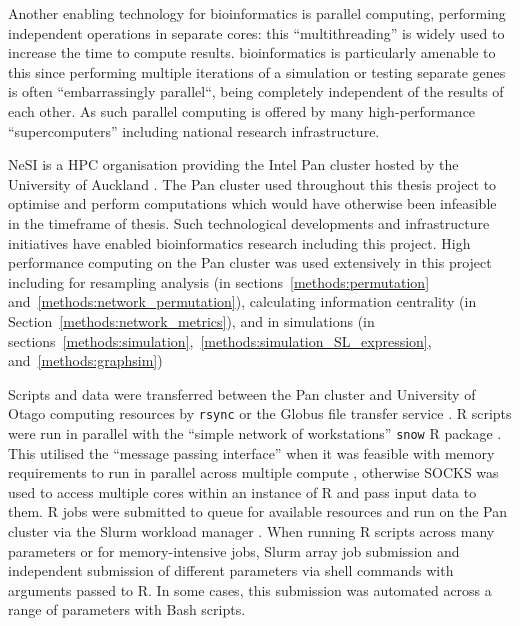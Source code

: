 Another enabling technology for \gls{bioinformatics} is parallel computing, performing independent operations in separate cores: this ``multithreading'' is widely used to increase the time to compute results. \Gls{bioinformatics} is particularly amenable to this since performing multiple iterations of a simulation or testing separate genes is often ``embarrassingly parallel``, being completely independent of the results of each other. As such parallel computing is offered by many high-performance ``supercomputers'' including national research infrastructure.

\Gls{NeSI} is a \gls{HPC} organisation providing the Intel Pan cluster hosted by the University of Auckland \citep{NeSI}. The Pan cluster used throughout this thesis project to optimise and perform computations which would have otherwise been infeasible in the timeframe of thesis. Such technological developments and infrastructure initiatives have enabled \gls{bioinformatics} research including this project.  High performance computing on the Pan cluster was used extensively in this project including for resampling analysis (in sections~\ref{methods:permutation} and~\ref{methods:network_permutation}), calculating \gls{information centrality} (in Section~\ref{methods:network_metrics}), and in simulations (in sections~\ref{methods:simulation},~\ref{methods:simulation_SL_expression}, and~\ref{methods:graphsim})

Scripts and data were transferred between the Pan cluster and University of Otago computing resources by \texttt{rsync} or the Globus file transfer service \citep{Globus}. R scripts \citep{R_core} were run in parallel with the ``simple network of workstations'' \texttt{snow} R package \citet{snow}. This utilised the ``message passing interface'' \citep{Rmpi} when it was feasible with memory requirements to run in parallel across multiple compute , otherwise SOCKS was used to access multiple cores within an instance of R and pass input data to them. R jobs were submitted to queue for available resources and run on the Pan cluster via the \gls{Slurm} workload manager \citep{slurm}. When running R scripts across many parameters or for memory-intensive jobs, \gls{Slurm} array job submission and independent submission of different parameters via shell commands with arguments passed to R. In some cases, this submission was automated across a range of parameters with Bash scripts.

